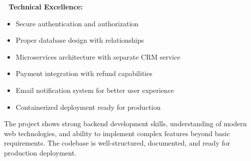 \documentclass[12pt,a4paper]{article}
\begin{document}
\textbf{💪 Technical Excellence:}
\begin{itemize}
    \item Secure authentication and authorization
    \item Proper database design with relationships
    \item Microservices architecture with separate CRM service
    \item Payment integration with refund capabilities
    \item Email notification system for better user experience
    \item Containerized deployment ready for production
\end{itemize}

The project shows strong backend development skills, understanding of modern web technologies, and ability to implement complex features beyond basic requirements. The codebase is well-structured, documented, and ready for production deployment.
\end{document}
